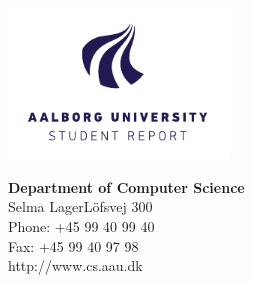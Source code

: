 {}
\thispagestyle{empty}

\begin{minipage}[t]{0.48\textwidth}
\vspace*{-25pt}			%
\includegraphics[height=4cm]{Images/AAU-logo-stud-UK-RGB}
\end{minipage}
\hfill
\begin{minipage}[t]{0.48\textwidth}
{\small \textbf{Department of Computer Science}\\
\small Selma LagerLöfsvej 300 \\
\small Phone: +45 99 40 99 40 \\
\small Fax: +45 99 40 97 98 \\
\small http://www.cs.aau.dk}

\end{minipage}

\vspace*{1cm}


